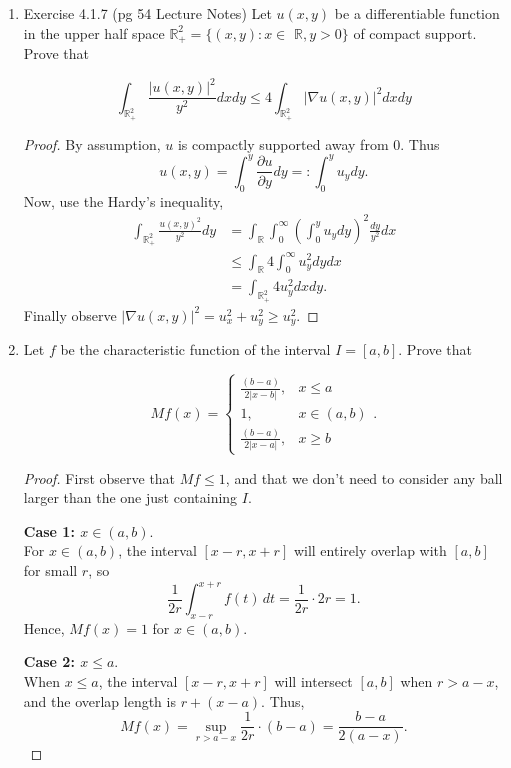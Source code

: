 \begin{enumerate}
\item Exercise 4.1.7 (pg 54 Lecture Notes)
Let $u(x, y)$ be a differentiable function in the upper half space $\mathbb{R}_{+}^2=\{(x, y): x \in$ $\mathbb{R}, y>0\}$ of compact support. Prove that

\[
\int_{\mathbb{R}_{+}^2} \frac{|u(x, y)|^2}{y^2} d x d y \leq 4 \int_{\mathbb{R}_{+}^2}|\nabla u(x, y)|^2 d x d y
\]
\begin{proof}
	By assumption, $u$ is compactly supported away from $0$. Thus
	\[
		u(x,y) = \int _0^y \frac{\partial u}{\partial y}  d y =: \int _0^y u_y dy
	.\] 
	Now, use the Hardy's inequality,
	\begin{align*}
		\int _{\mathbb{R}^2_+}  \frac{u(x,y)^2}{y^2} dy
		&= \int _{\mathbb{R}} \int _0^\infty \left(  \int _0^y u_y dy \right)  ^2 \frac{dy }{y^2} dx\\
		&\leq \int _{\mathbb{R}} 4\int _0^\infty u_y^2 dy dx\\
		&= \int _{\mathbb{R}^2_+} 4 u_y^2 dx dy
	.\end{align*}
	Finally observe $\left| \nabla u(x,y) \right|^2 = u_x^2 + u_y^2 \ge u_y^2 $.
\end{proof}
\item 
Let $f$ be the characteristic function of the interval $I=[a, b]$. Prove that

\[
Mf(x)= \begin{cases}\frac{(b-a)}{2|x-b|}, & x \leq a \\ 1, & x \in(a, b) \\ \frac{(b-a)}{2|x-a|}, & x \geq b\end{cases}.
\]

\begin{proof}

First observe that $Mf \le 1$, and that we don't need to consider any ball larger than the one just containing $I$.

\textbf{Case 1: \( x \in (a, b) \)}. \\
For \( x \in (a, b) \), the interval \( [x-r, x+r] \) will entirely overlap with \( [a, b] \) for small \( r \), so
\[
\frac{1}{2r} \int_{x-r}^{x+r} f(t) \, dt = \frac{1}{2r} \cdot 2r = 1.
\]
Hence, \( Mf(x) = 1 \) for \( x \in (a, b) \).

\textbf{Case 2: \( x \leq a \)}. \\
When \( x \leq a \), the interval \( [x-r, x+r] \) will intersect \( [a, b] \) when \( r > a - x \), and the overlap length is \( r + (x - a) \). Thus,
\[
Mf(x) = \sup_{r > a - x} \frac{1}{2r} \cdot (b - a) = \frac{b - a}{2(a - x)}.
\]


\end{proof}
\end{enumerate}
